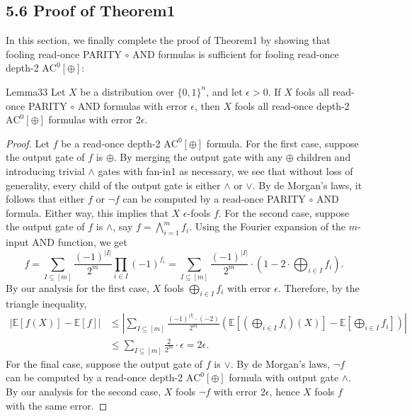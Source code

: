 \subsection*{5.6 Proof of Theorem1}
In this section, we finally complete the proof of Theorem1 by showing that fooling read-once PARITY $\circ$ AND formulas is sufficient for fooling read-once depth-2 $\mathrm{AC}^0[\oplus]$:
\begin{authorclaim}{Lemma33}
Let $X$ be a distribution over $\{0,1\}^n$, and let $\epsilon>0$. If $X$ fools all read-once PARITY $\circ$ AND formulas with error $\epsilon$, then $X$ fools all read-once depth-2 $\mathrm{AC}^0[\oplus]$ formulas with error $2\epsilon$.
\end{authorclaim}
\begin{proof}
Let $f$ be a read-once depth-2 $\mathrm{AC}^0[\oplus]$ formula.
For the first case, suppose the output gate of $f$ is $\oplus$. By merging the output gate with any $\oplus$ children and introducing trivial $\wedge$ gates with fan-in1 as necessary, we see that without loss of generality, every child of the output gate is either $\wedge$ or $\vee$. By de Morgan's laws, it follows that either $f$ or $\neg f$ can be computed by a read-once PARITY $\circ$ AND formula. Either way, this implies that $X$ $\epsilon$-fools $f$.
For the second case, suppose the output gate of $f$ is $\wedge$, say $f=\bigwedge_{i=1}^mf_i$. Using the Fourier expansion of the $m$-input AND function, we get
\[
f=\sum_{I\subseteq[m]}\frac{(-1)^{|I|}}{2^m}\prod_{i\in I}(-1)^{f_i}
=\sum_{I\subseteq[m]}\frac{(-1)^{|I|}}{2^m}\cdot\left(1-2\cdot\bigoplus_{i\in I}f_i\right).
\]
By our analysis for the first case, $X$ fools $\bigoplus_{i\in I}f_i$ with error $\epsilon$. Therefore, by the triangle inequality,
\begin{align*}
|\mathbb E[f(X)]-\mathbb E[f]|
&\le\left|\sum_{I\subseteq[m]}\frac{(-1)^{|I|}\cdot(-2)}{2^m}
\left(\mathbb E[(\bigoplus_{i\in I}f_i)(X)]-\mathbb E[\bigoplus_{i\in I}f_i]\right)\right|\\
&\le\sum_{I\subseteq[m]}\frac2{2^m}\cdot\epsilon=2\epsilon.
\end{align*}
For the final case, suppose the output gate of $f$ is $\vee$. By de Morgan's laws, $\neg f$ can be computed by a read-once depth-2 $\mathrm{AC}^0[\oplus]$ formula with output gate $\wedge$. By our analysis for the second case, $X$ fools $\neg f$ with error $2\epsilon$, hence $X$ fools $f$ with the same error.
\end{proof}
